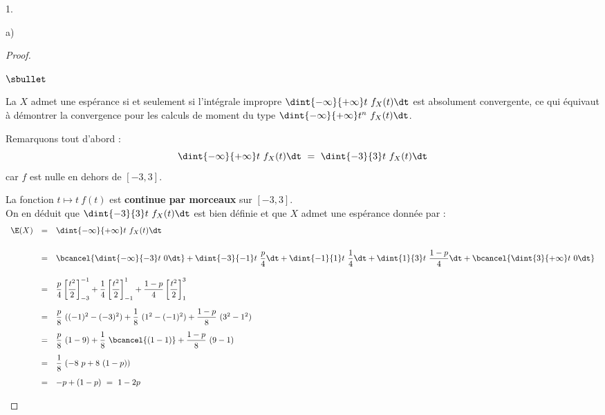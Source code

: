 \begin{noliste}{1.}
\begin{noliste}{a)}
    \begin{proof}~
      \begin{noliste}{$\sbullet$}
      \item La \var $X$ admet une espérance si et seulement si
        l'intégrale impropre $\dint{-\infty}{+\infty} t \ f_X(t) \dt$
        est absolument convergente, ce qui équivaut à démontrer la
        convergence pour les calculs de moment du type
        $\dint{-\infty}{+\infty} t^n \ f_X(t) \dt$.
      \item Remarquons tout d'abord :
        \[
        \dint{-\infty}{+\infty} t \ f_X(t) \dt \ = \ \dint{-3}{3} t \
        f_X(t) \dt
        \]
        car $f$ est nulle en dehors de $[-3, 3]$.

      \item La fonction $t \mapsto t \ f(t)$ est {\bf continue par
          morceaux} sur $[-3, 3]$.\\
        On en déduit que $\dint{-3}{3} t \ f_X(t) \dt$ est bien
        définie et que $X$ admet une espérance donnée par :
        \[
        \begin{array}{rcl}
          \E(X) %
          & = & \dint{-\infty}{+\infty} t \ f_X(t) \dt \\[.6cm]
          & = & \bcancel{\dint{-\infty}{-3} t \ 0 \dt} +
          \dint{-3}{-1}t\ \dfrac{p}{4}\dt + \dint{-1}{1}t\
          \dfrac{1}{4}\dt + \dint{1}{3}t\ \dfrac{1-p}{4}\dt +
          \bcancel{\dint{3}{+\infty} t \ 0 \dt} \\[.6cm]
          & = & \dfrac{p}{4}\left[ \dfrac{t^2}{2} \right]_{-3}^{-1}
          +\dfrac{1}{4}\left[ \dfrac{t^2}{2} \right]_{-1}^{1}
          +\dfrac{1-p}{4}\left[ \dfrac{t^2}{2} \right]_{1}^{3}
          \\[.6cm]
          & = & \dfrac{p}{8} \ ((-1)^2 - (-3)^2) + \dfrac{1}{8} \
          (1^2 - (-1)^2) + \dfrac{1-p}{8} \ (3^2 - 1^2) \\[.4cm]
          & = & \dfrac{p}{8} \ (1 - 9) + \dfrac{1}{8} \
          \bcancel{(1 - 1)} + \dfrac{1-p}{8} \ (9 - 1) 
          \\[.4cm]
          & = & \dfrac{1}{8} \ (-8 \ p + 8 \ (1-p))
          \\[.4cm]
          & = & -p + (1-p) \ = \ 1-2p
        \end{array}
        \]
        

\end{noliste}
\end{proof}
\end{noliste}
\end{noliste}
